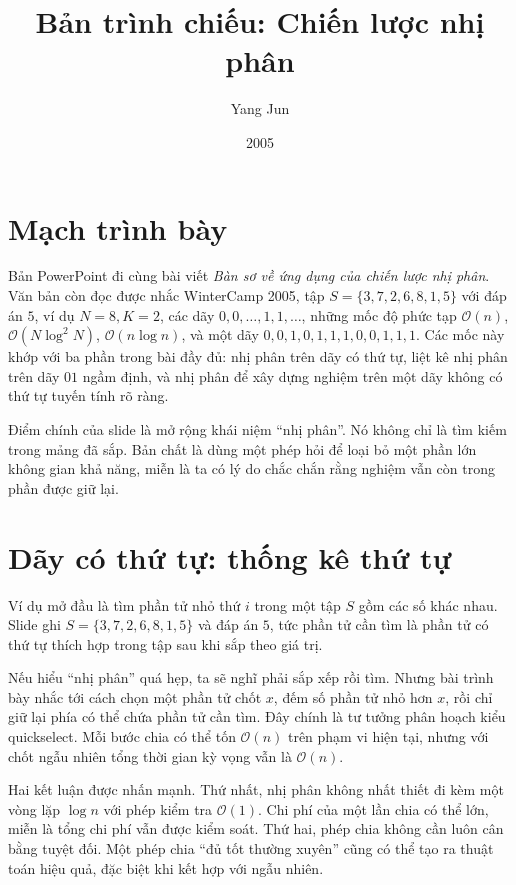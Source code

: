 \documentclass[11pt]{article}
\title{Bản trình chiếu: Chiến lược nhị phân}
\author{Yang Jun}
\date{2005}
\newcommand{\Oh}{\mathcal{O}}
\begin{document}
\maketitle


\section{Mạch trình bày}

Bản PowerPoint đi cùng bài viết \emph{Bàn sơ về ứng dụng của chiến lược nhị
phân}. Văn bản còn đọc được nhắc WinterCamp 2005, tập
\(S=\{3,7,2,6,8,1,5\}\) với đáp án \(5\), ví dụ \(N=8,K=2\), các dãy
\(0,0,\ldots,1,1,\ldots\), những mốc độ phức tạp \(\Oh(n)\),
\(\Oh(N\log^2 N)\), \(\Oh(n\log n)\), và một dãy \(0,0,1,0,1,1,1,0,0,1,1,1\).
Các mốc này khớp với ba phần trong bài đầy đủ: nhị phân trên dãy có thứ tự,
liệt kê nhị phân trên dãy \(01\) ngầm định, và nhị phân để xây dựng nghiệm
trên một dãy không có thứ tự tuyến tính rõ ràng.

Điểm chính của slide là mở rộng khái niệm ``nhị phân''. Nó không chỉ là tìm
kiếm trong mảng đã sắp. Bản chất là dùng một phép hỏi để loại bỏ một phần lớn
không gian khả năng, miễn là ta có lý do chắc chắn rằng nghiệm vẫn còn trong
phần được giữ lại.

\section{Dãy có thứ tự: thống kê thứ tự}

Ví dụ mở đầu là tìm phần tử nhỏ thứ \(i\) trong một tập \(S\) gồm các số khác
nhau. Slide ghi \(S=\{3,7,2,6,8,1,5\}\) và đáp án \(5\), tức phần tử cần tìm
là phần tử có thứ tự thích hợp trong tập sau khi sắp theo giá trị.

Nếu hiểu ``nhị phân'' quá hẹp, ta sẽ nghĩ phải sắp xếp rồi tìm. Nhưng bài
trình bày nhắc tới cách chọn một phần tử chốt \(x\), đếm số phần tử nhỏ hơn
\(x\), rồi chỉ giữ lại phía có thể chứa phần tử cần tìm. Đây chính là tư tưởng
phân hoạch kiểu quickselect. Mỗi bước chia có thể tốn \(\Oh(n)\) trên phạm vi
hiện tại, nhưng với chốt ngẫu nhiên tổng thời gian kỳ vọng vẫn là \(\Oh(n)\).

Hai kết luận được nhấn mạnh. Thứ nhất, nhị phân không nhất thiết đi kèm một
vòng lặp \(\log n\) với phép kiểm tra \(\Oh(1)\). Chi phí của một lần chia có
thể lớn, miễn là tổng chi phí vẫn được kiểm soát. Thứ hai, phép chia không
cần luôn cân bằng tuyệt đối. Một phép chia ``đủ tốt thường xuyên'' cũng có
thể tạo ra thuật toán hiệu quả, đặc biệt khi kết hợp với ngẫu nhiên.
\end{document}
